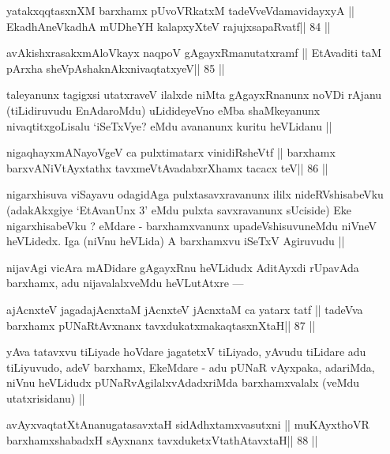 \begin{shl}
yatakxqqtasxnXM barxhamx pUvoVRkatxM tadeVveVdamavidayxyA ||
EkadhA\s neVkadhA mUDheYH kalapxyXteV rajujxsapaRvatf\hfill || 84 ||
\end{shl}

\begin{shl}
avAkishxrasakxmAloVkayx naqpoV gAgayxRmanutatxramf ||
EtAvaditi taM pArxha sheVpAshaknAkxnivaqtatxyeV\hfill || 85 ||
\end{shl}

\begin{artha}
taleyanunx tagigxsi utatxraveV ilalxde niMta gAgayxRnanunx noVDi rAjanu (tiLidiruvudu EnAdaroMdu) uLidideyeVno eMba shaMkeyanunx nivaqtitxgoLisalu `iSeTxVye? eMdu avananunx kuritu heVLidanu ||
\end{artha} 

\begin{shl}
nigaqhayxmANayoVgeV ca pulxtimatarx vinidiRsheVtf ||
barxhamx barxvANiVtAyxtathx tavxmeVtAvadabxrXhamx tacacx teV\hfill || 86 ||
\end{shl}

\begin{artha}
nigarxhisuva viSayavu odagidAga pulxtasavxravanunx ililx nideRVshisabeVku (adakAkxgiye `EtAvanUnx 3' eMdu pulxta savxravanunx sUciside) Eke nigarxhisabeVku ? eMdare - barxhamxvanunx upadeVshisuvuneMdu niVneV heVLidedx. Iga (niVnu heVLida) A barxhamxvu iSeTxV Agiruvudu ||
\end{artha}

\begin{artha}
nijavAgi vicAra mADidare gAgayxRnu heVLidudx AditAyxdi rUpavAda barxhamx, adu nijavalalxveMdu heVLutAtxre ---
\end{artha} 

\begin{shl}
ajAcnxteV jagadajAcnxtaM jAcnxteV jAcnxtaM ca yatarx tatf ||
tadeVva barxhamx pUNaRtAvxnanx tavxdukatxmakaqtasxnXtaH\hfill || 87 ||
\end{shl}

\begin{artha}
yAva tatavxvu tiLiyade hoVdare jagatetxV tiLiyado, yAvudu tiLidare adu tiLiyuvudo, adeV barxhamx, EkeMdare - adu pUNaR vAyxpaka, adariMda, niVnu heVLidudx pUNaRvAgilalxvAdadxriMda barxhamxvalalx (veMdu utatxrisidanu) ||
\end{artha}

\begin{shl}
avAyxvaqtatXtAnanugatasavxtaH sidAdhxtamxvasutxni ||
muKAyxthoVR barxhamxshabadxH sAyxnanx tavxduketxV\s tathAtavxtaH\hfill || 88 ||
\end{shl}


